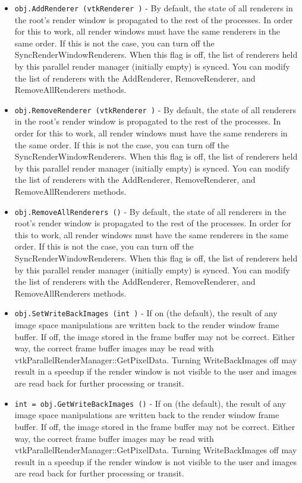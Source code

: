 \begin{itemize}
\item  \verb|obj.AddRenderer (vtkRenderer )| -  By default, the state of all renderers in the root's render window is
 propagated to the rest of the processes.  In order for this to work, all
 render windows must have the same renderers in the same order.  If this is
 not the case, you can turn off the SyncRenderWindowRenderers.  When this
 flag is off, the list of renderers held by this parallel render manager
 (initially empty) is synced.  You can modify the list of renderers with the
 AddRenderer, RemoveRenderer, and RemoveAllRenderers methods.

\item  \verb|obj.RemoveRenderer (vtkRenderer )| -  By default, the state of all renderers in the root's render window is
 propagated to the rest of the processes.  In order for this to work, all
 render windows must have the same renderers in the same order.  If this is
 not the case, you can turn off the SyncRenderWindowRenderers.  When this
 flag is off, the list of renderers held by this parallel render manager
 (initially empty) is synced.  You can modify the list of renderers with the
 AddRenderer, RemoveRenderer, and RemoveAllRenderers methods.

\item  \verb|obj.RemoveAllRenderers ()| -  By default, the state of all renderers in the root's render window is
 propagated to the rest of the processes.  In order for this to work, all
 render windows must have the same renderers in the same order.  If this is
 not the case, you can turn off the SyncRenderWindowRenderers.  When this
 flag is off, the list of renderers held by this parallel render manager
 (initially empty) is synced.  You can modify the list of renderers with the
 AddRenderer, RemoveRenderer, and RemoveAllRenderers methods.

\item  \verb|obj.SetWriteBackImages (int )| -  If on (the default), the result of any image space manipulations are
 written back to the render window frame buffer.  If off, the image
 stored in the frame buffer may not be correct.  Either way, the
 correct frame buffer images may be read with
 vtkParallelRenderManager::GetPixelData.  Turning WriteBackImages off
 may result in a speedup if the render window is not visible to the user
 and images are read back for further processing or transit.

\item  \verb|int = obj.GetWriteBackImages ()| -  If on (the default), the result of any image space manipulations are
 written back to the render window frame buffer.  If off, the image
 stored in the frame buffer may not be correct.  Either way, the
 correct frame buffer images may be read with
 vtkParallelRenderManager::GetPixelData.  Turning WriteBackImages off
 may result in a speedup if the render window is not visible to the user
 and images are read back for further processing or transit.


\end{itemize}
